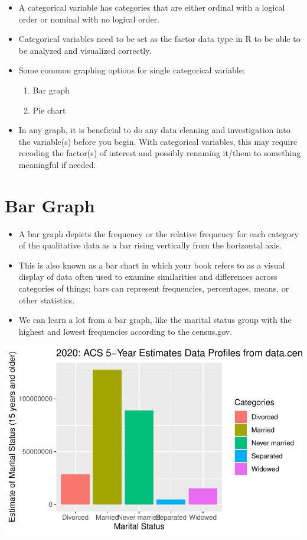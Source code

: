 \documentclass[
  letterpaper,
  DIV=11,
  numbers=noendperiod]{scrreprt}
\providecommand{\tightlist}{%
  \setlength{\itemsep}{0pt}\setlength{\parskip}{0pt}}\usepackage{longtable,booktabs,array}
\begin{document}
\begin{itemize}
\tightlist
\item
  A categorical variable has categories that are either ordinal with a
  logical order or nominal with no logical order.
\item
  Categorical variables need to be set as the factor data type in R to
  be able to be analyzed and visualized correctly.
\item
  Some common graphing options for single categorical variable:

  \begin{enumerate}
  \def\labelenumi{\arabic{enumi}.}
  \tightlist
  \item
    Bar graph
  \item
    Pie chart
  \end{enumerate}
\item
  In any graph, it is beneficial to do any data cleaning and
  investigation into the variable(s) before you begin. With categorical
  variables, this may require recoding the factor(s) of interest and
  possibly renaming it/them to something meaningful if needed.
\end{itemize}

\section{Bar Graph}\label{bar-graph}

\begin{itemize}
\tightlist
\item
  A bar graph depicts the frequency or the relative frequency for each
  category of the qualitative data as a bar rising vertically from the
  horizontal axis.
\item
  This is also known as a bar chart in which your book refers to as a
  visual display of data often used to examine similarities and
  differences across categories of things; bars can represent
  frequencies, percentages, means, or other statistics.
\item
  We can learn a lot from a bar graph, like the marital status group
  with the highest and lowest frequencies according to the census.gov.
\end{itemize}

\includegraphics{dataviz_files/figure-pdf/unnamed-chunk-3-1.pdf}
\end{document}
